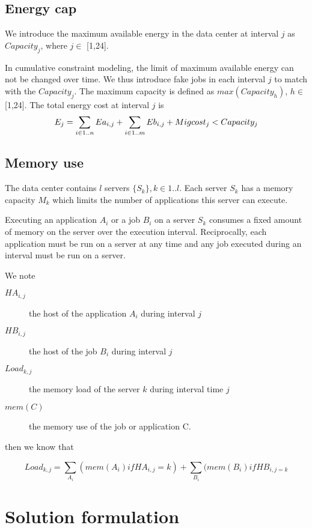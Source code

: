 \documentclass[a4paper]{article}
\begin{document}
\subsection{Energy cap}

We  introduce the maximum available energy in the data center at interval $j$ as $Capacity_j$, where $j\in$ [1,24].

In cumulative constraint modeling, the limit of maximum available energy can not be changed over time. We thus introduce fake jobs in each interval $j$ to match with the $Capacity_j$. The maximum capacity is defined as $max (Capacity_{h})$, ${h}\in$ [1,24]. The total energy cost at interval $j$ is 
\[E_j=\sum_{i\in1..n} Ea_{i,j} + \sum_{i\in1..m} Eb_{i,j}+Mig{\sc cost}_j < Capacity_j\]


\subsection{Memory use}

The data center contains $l$ servers $\{S_k\}, k\in 1..l$. Each server $S_k$ has a memory capacity $M_k$ which limits the number of applications this server can execute.

Executing an application $A_i$ or a job $B_i$ on a server $S_k$ consumes a fixed amount of memory 
on the server over the execution interval. Reciprocally, each application must be run on a server at any time and any job executed during an interval must be run on a server.

We note
\begin{description}
\item[$HA_{i,j}$] the host of the application $A_i$ during interval $j$
\item[$HB_{i,j}$] the host of the job $B_i$ during interval $j$
\item[$Load_{k,j}$] the memory load of the server $k$ during interval time $j$
\item[$mem(C)$] the memory use of the job or application C.
\end{description}

then we know that

\begin{equation}
Load_{k,j} = \sum_{A_i}(mem(A_i) if HA_{i,j}=k) + \sum_{B_i}(mem(B_i) if HB_{i,j=k}
\end{equation}


\section{Solution formulation}
\end{document}
